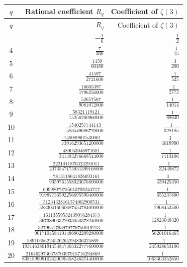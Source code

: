 \begin{longtable}{@{}crr@{}}
\toprule $q$ & Rational coefficient $R_q$ & Coefficient of $\zeta(3)$ \\
\midrule\endfirsthead
\toprule $q$ & $R_q$ & Coefficient of $\zeta(3)$ \\ \midrule\endhead
\bottomrule\endlastfoot
3 & $-\frac{1}{6}$ & $\frac{1}{2}$ \\
4 & $\frac{7}{360}$ & $\frac{1}{15}$ \\
5 & $\frac{1459}{60480}$ & $\frac{3}{280}$ \\
6 & $\frac{41597}{2721600}$ & $\frac{1}{525}$ \\
7 & $\frac{16605397}{1796256000}$ & $\frac{1}{2772}$ \\
8 & $\frac{52657567}{9081072000}$ & $\frac{1}{14014}$ \\
9 & $\frac{58321119121}{15256200960000}$ & $\frac{1}{68640}$ \\
10 & $\frac{1540257744143}{583549686720000}$ & $\frac{1}{328185}$ \\
11 & $\frac{140089601530061}{73916293651200000}$ & $\frac{3}{4618900}$ \\
12 & $\frac{480053046971681}{341493276668544000}$ & $\frac{1}{7113106}$ \\
13 & $\frac{2221011870323291011}{2073547175931399168000}$ & $\frac{1}{32449872}$ \\
14 & $\frac{7813118641826693161}{9359761558023676800000}$ & $\frac{3}{439425350}$ \\
15 & $\frac{60998079785613798244717}{91987736592256695590400000}$ & $\frac{1}{655237800}$ \\
16 & $\frac{31234328161374002908531}{58330416060687554784000000}$ & $\frac{1}{2908453500}$ \\
17 & $\frac{16113559532439076284373}{36738903322033050378240000}$ & $\frac{1}{12823048320}$ \\
18 & $\frac{3279951793970779750019213}{9017104584101486802209280000}$ & $\frac{1}{56201016465}$ \\
19 & $\frac{58910656224526265294836325869}{193146380191453847303322777600000}$ & $\frac{1}{245028653100}$ \\
20 & $\frac{216462973067870397915716294869}{838159909102420090458246374400000}$ & $\frac{1}{1063303352650}$ \\
\end{longtable}
